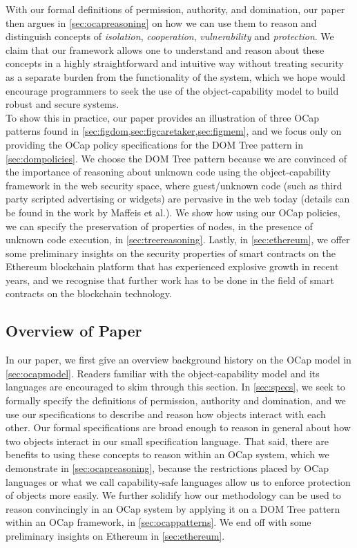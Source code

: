 \documentclass[a4paper,11pt,twoside]{article}
\begin{document}
With our formal definitions of permission, authority, and domination, our paper then argues in \cref{sec:ocapreasoning} on how we can use them to reason and distinguish concepts of \textit{isolation}, \textit{cooperation}, \textit{vulnerability} and \textit{protection}. We claim that our framework allows one to understand and reason about these concepts in a highly straightforward and intuitive way without treating security as a separate burden from the functionality of the system, which we hope would encourage programmers to seek the use of the object-capability model to build robust and secure systems.\\



To show this in practice, our paper provides an illustration of three OCap patterns found in \cref{sec:figdom,sec:figcaretaker,sec:figmem}, and we focus only on providing the OCap policy specifications for the DOM Tree pattern in \cref{sec:dompolicies}. We choose the DOM Tree pattern because we are convinced of the importance of reasoning about unknown code using the object-capability framework in the web security space, where guest/unknown code (such as third party scripted advertising or widgets) are pervasive in the web today (details can be found in the work by Maffeis et al.\cite{maffeis2010}). We show how using our OCap policies, we can specify the preservation of properties of nodes, in the presence of unknown code execution, in \cref{sec:treereasoning}. Lastly, in \cref{sec:ethereum}, we offer some preliminary insights on the security properties of smart contracts on the Ethereum blockchain platform that has experienced explosive growth in recent years, and we recognise that further work has to be done in the field of smart contracts on the blockchain technology.

\subsection{Overview of Paper}
In our paper, we first give an overview background history on the OCap model in \cref{sec:ocapmodel}. Readers familiar with the object-capability model and its languages are encouraged to skim through this section. In \cref{sec:specs}, we seek to formally specify the definitions of permission, authority and domination, and we use our specifications to describe and reason how objects interact with each other. Our formal specifications are broad enough to reason in general about how two objects interact in our small specification language. That said, there are benefits to using these concepts to reason within an OCap system, which we demonstrate in \cref{sec:ocapreasoning}, because the restrictions placed by OCap languages or what we call capability-safe languages allow us to enforce protection of objects more easily. We further solidify how our methodology can be used to reason convincingly in an OCap system by applying it on a DOM Tree pattern within an OCap framework, in \cref{sec:ocappatterns}. We end off with some preliminary insights on Ethereum in \cref{sec:ethereum}.
\end{document}
